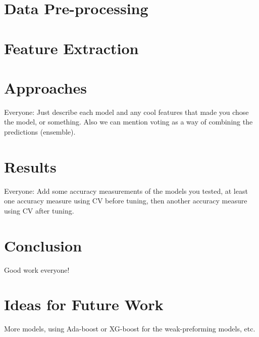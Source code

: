 \documentclass{article}
\begin{document}
\section{Data Pre-processing}
\section{Feature Extraction}
\section{Approaches}
Everyone: Just describe each model and any cool features that made you chose the model, or something. Also we can mention voting as a way of combining the predictions (ensemble).
\section{Results}
Everyone: Add some accuracy measurements of the models you tested, at least one accuracy measure using CV before tuning, then another accuracy measure using CV after tuning.
\section{Conclusion}
Good work everyone!
\section{Ideas for Future Work}
More models, using Ada-boost or XG-boost for the weak-preforming models, etc.
\end{document}
